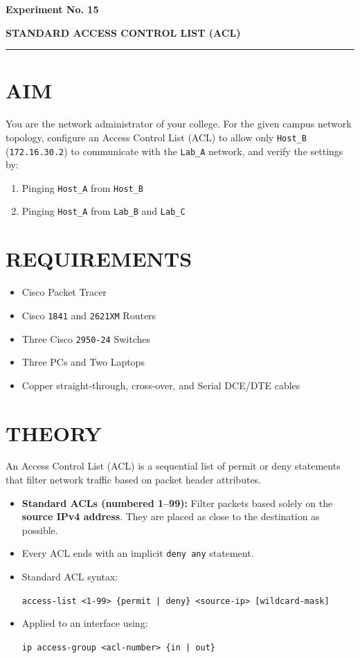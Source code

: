 \documentclass[12pt,a4paper]{article}
\newcommand{\experiment}[2]{
	\newpage
	
	\begin{center}
		\noindent
		\begin{minipage}{\textwidth}
			\centering
			{\textbf{\Large Experiment No. #1}}
			
			\vspace{1cm}
			
			\textbf{\Large #2}
		\end{minipage}
		
		\vspace{0.3cm}
		\noindent\rule{\textwidth}{0.6pt}
	\end{center}
}
\begin{document}

\experiment{15}{STANDARD ACCESS CONTROL LIST (ACL)}

\section*{AIM}
You are the network administrator of your college. For the given campus network topology, configure an Access Control List (ACL) to allow only \texttt{Host\_B} (\texttt{172.16.30.2}) to communicate with the \texttt{Lab\_A} network, and verify the settings by:
\begin{enumerate}
	\item[(a)] Pinging \texttt{Host\_A} from \texttt{Host\_B}
	\item[(b)] Pinging \texttt{Host\_A} from \texttt{Lab\_B} and \texttt{Lab\_C}
\end{enumerate}

\section*{REQUIREMENTS}
\begin{itemize}
	\item Cisco Packet Tracer
	\item Cisco \texttt{1841} and \texttt{2621XM} Routers 
	\item Three Cisco \texttt{2950-24} Switches
	\item Three PCs and Two Laptops
	\item Copper straight-through, cross-over, and Serial DCE/DTE cables
\end{itemize}

\section*{THEORY}
An Access Control List (ACL) is a sequential list of permit or deny statements that filter network traffic based on packet header attributes.
\begin{itemize}
	\item \textbf{Standard ACLs (numbered 1--99):} Filter packets based solely on the \textbf{source IPv4 address}. They are placed as close to the destination as possible.
	\item Every ACL ends with an implicit \texttt{deny any} statement.
	\item Standard ACL syntax:
	\begin{center}
		\texttt{access-list <1-99> \{permit | deny\} <source-ip> [wildcard-mask]}
	\end{center}
	\item Applied to an interface using:
	\begin{center}
		\texttt{ip access-group <acl-number> \{in | out\}}
	\end{center}
\end{itemize}
\end{document}
